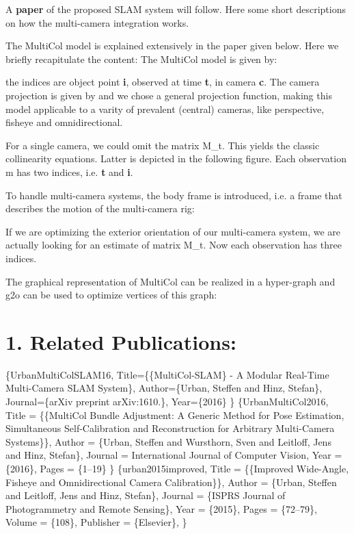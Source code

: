 A {\bfseries paper} of the proposed S\+L\+AM system will follow. Here some short descriptions on how the multi-\/camera integration works.

The Multi\+Col model is explained extensively in the paper given below. Here we briefly recapitulate the content\+: The Multi\+Col model is given by\+: 

the indices are object point {\bfseries i}, observed at time {\bfseries t}, in camera {\bfseries c}. The camera projection is given by  and we chose a general projection function, making this model applicable to a varity of prevalent (central) cameras, like perspective, fisheye and omnidirectional.

For a single camera, we could omit the matrix M\+\_\+t. This yields the classic collinearity equations. Latter is depicted in the following figure. Each observation m\textquotesingle{} has two indices, i.\+e. {\bfseries t} and {\bfseries i}. 

To handle multi-\/camera systems, the body frame is introduced, i.\+e. a frame that describes the motion of the multi-\/camera rig\+: 

If we are optimizing the exterior orientation of our multi-\/camera system, we are actually looking for an estimate of matrix M\+\_\+t. Now each observation has three indices.

The graphical representation of Multi\+Col can be realized in a hyper-\/graph and g2o can be used to optimize vertices of this graph\+: 

\section*{1. Related Publications\+:}

\{Urban\+Multi\+Col\+S\+L\+A\+M16, Title=\{\{Multi\+Col-\/\+S\+L\+AM\} -\/ A Modular Real-\/\+Time Multi-\/\+Camera S\+L\+AM System\}, Author=\{Urban, Steffen and Hinz, Stefan\}, Journal=\{ar\+Xiv preprint ar\+Xiv\+:1610.\}, Year=\{2016\} \} \{Urban\+Multi\+Col2016, Title = \{\{Multi\+Col Bundle Adjustment\+: A Generic Method for Pose Estimation, Simultaneous Self-\/\+Calibration and Reconstruction for Arbitrary Multi-\/\+Camera Systems\}\}, Author = \{Urban, Steffen and Wursthorn, Sven and Leitloff, Jens and Hinz, Stefan\}, Journal = International Journal of Computer Vision, Year = \{2016\}, Pages = \{1--19\} \} \{urban2015improved, Title = \{\{Improved Wide-\/\+Angle, Fisheye and Omnidirectional Camera Calibration\}\}, Author = \{Urban, Steffen and Leitloff, Jens and Hinz, Stefan\}, Journal = \{I\+S\+P\+RS Journal of Photogrammetry and Remote Sensing\}, Year = \{2015\}, Pages = \{72--79\}, Volume = \{108\}, Publisher = \{Elsevier\}, \}

